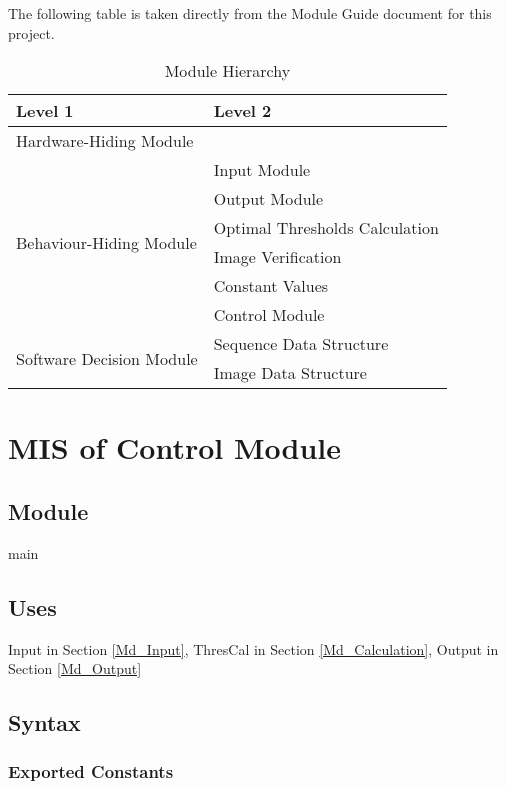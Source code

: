 \documentclass[12pt, titlepage]{article}
\begin{document}
The following table is taken directly from the Module Guide document for this
project.

\begin{table}[h!]
\centering
\begin{tabular}{p{} p{}}
\toprule
\textbf{Level 1} & \textbf{Level 2}\\
\midrule

{Hardware-Hiding Module} & ~ \\
\midrule

\multirow{6}{0.3\textwidth}{Behaviour-Hiding Module}
& Input Module\\
& Output Module\\
& Optimal Thresholds Calculation\\
& Image Verification\\
& Constant Values\\
& Control Module\\
\midrule

\multirow{2}{0.3\textwidth}{Software Decision Module}
& Sequence Data Structure\\
& Image Data Structure\\
\bottomrule

\end{tabular}
\caption{Module Hierarchy}
\label{TblMH}
\end{table}

\newpage

\section{MIS of Control Module} \label{Md_Control}
\subsection{Module}
main
\subsection{Uses}

Input in Section \ref{Md_Input}, ThresCal in Section \ref{Md_Calculation},
Output in Section \ref{Md_Output}

\subsection{Syntax}

\subsubsection{Exported Constants}
\end{document}

